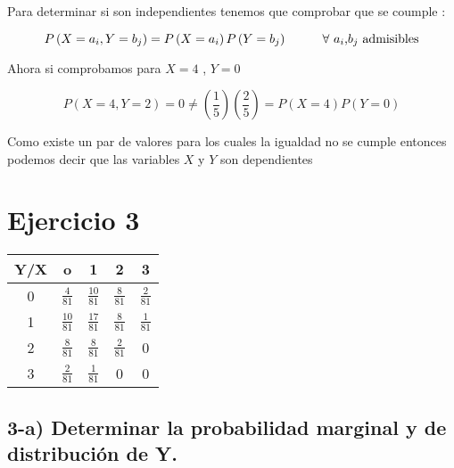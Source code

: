 \documentclass[12pt]{article}
\begin{document}
\begin{flushleft}
    Para determinar si son independientes tenemos que comprobar que se coumple :


    \begin{equation*}
        P \left(X = a_i , Y = b_j\right)  = P \left(X = a_i\right) P \left(Y= b_j\right)
        \hspace*{1cm }
        \mbox{$\forall$ $a_i$,$b_j$ admisibles}
    \end{equation*}


    Ahora si comprobamos para $X = 4 $ , $Y = 0$


    \begin{equation*}
        P \left(X =4 , Y =2 \right) = 0 \neq \left(\frac{1}{5}\right) \left(\frac{2}{5}\right)  = P\left(X =4 \right)  P \left(Y = 0\right)
    \end{equation*}


    Como existe un par de valores para los cuales la igualdad no se cumple entonces
    podemos decir que las variables $X$ y $Y$ son dependientes
\end{flushleft}



\section*{Ejercicio 3}


\begin{center}
    \renewcommand{\arraystretch}{1.5}
    \begin{tabular}{|c|c|c|c|c|}
        \hline
        Y/X & o               & 1               & 2              & 3
        \\
        \hline
        0   & $\frac{4}{81}$  & $\frac{10}{81}$ & $\frac{8}{81}$ & $\frac{2}{81} $
        \\
        \hline
        1   & $\frac{10}{81}$ & $\frac{17}{81}$ & $\frac{8}{81}$ & $\frac{1}{81}$
        \\
        \hline
        2   & $\frac{8}{81}$  & $\frac{8}{81}$  & $\frac{2}{81}$ & 0
        \\
        \hline
        3   & $\frac{2}{81}$  & $\frac{1}{81}$  & 0              & 0
        \\
        \hline
    \end{tabular}
\end{center}

\subsection*{ 3-a) Determinar la probabilidad marginal y de distribuci\'on de Y.}
\end{document}
